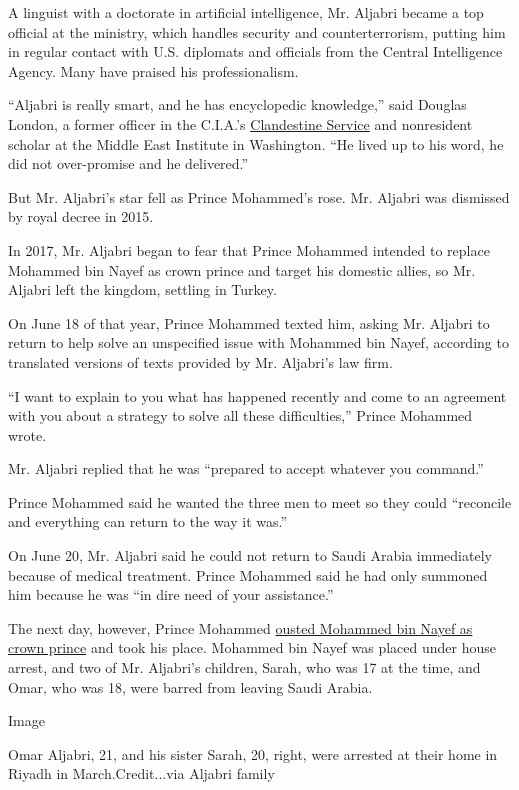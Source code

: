 A linguist with a doctorate in artificial intelligence, Mr. Aljabri
became a top official at the ministry, which handles security and
counterterrorism, putting him in regular contact with U.S. diplomats and
officials from the Central Intelligence Agency. Many have praised his
professionalism.

``Aljabri is really smart, and he has encyclopedic knowledge,'' said
Douglas London, a former officer in the C.I.A.'s
\href{https://www.cia.gov/offices-of-cia/clandestine-service/index.html}{Clandestine
Service} and nonresident scholar at the Middle East Institute in
Washington. ``He lived up to his word, he did not over-promise and he
delivered.''

But Mr. Aljabri's star fell as Prince Mohammed's rose. Mr. Aljabri was
dismissed by royal decree in 2015.

In 2017, Mr. Aljabri began to fear that Prince Mohammed intended to
replace Mohammed bin Nayef as crown prince and target his domestic
allies, so Mr. Aljabri left the kingdom, settling in Turkey.

On June 18 of that year, Prince Mohammed texted him, asking Mr. Aljabri
to return to help solve an unspecified issue with Mohammed bin Nayef,
according to translated versions of texts provided by Mr. Aljabri's law
firm.

``I want to explain to you what has happened recently and come to an
agreement with you about a strategy to solve all these difficulties,''
Prince Mohammed wrote.

Mr. Aljabri replied that he was ``prepared to accept whatever you
command.''

Prince Mohammed said he wanted the three men to meet so they could
``reconcile and everything can return to the way it was.''

On June 20, Mr. Aljabri said he could not return to Saudi Arabia
immediately because of medical treatment. Prince Mohammed said he had
only summoned him because he was ``in dire need of your assistance.''

The next day, however, Prince Mohammed
\href{https://www.nytimes.com/2017/07/18/world/middleeast/saudi-arabia-mohammed-bin-nayef-mohammed-bin-salman.html}{ousted
Mohammed bin Nayef as crown prince} and took his place. Mohammed bin
Nayef was placed under house arrest, and two of Mr. Aljabri's children,
Sarah, who was 17 at the time, and Omar, who was 18, were barred from
leaving Saudi Arabia.

Image

Omar Aljabri, 21, and his sister Sarah, 20, right, were arrested at
their home in Riyadh in March.Credit...via Aljabri family


